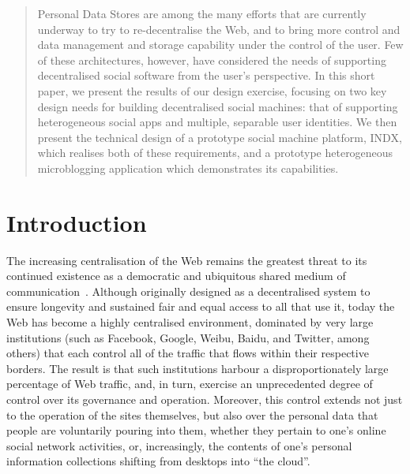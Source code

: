\documentclass{sig-alternate}
\begin{document}
\maketitle


\begin{abstract}
Personal Data Stores are among the many efforts that are currently underway to try to re-decentralise the Web, and to bring more control and data management and storage capability under the control of the user.  Few of these architectures, however, have considered the needs of supporting decentralised social software from  the user's perspective. In this short paper, we present the results of our design exercise, focusing on two key design needs for building decentralised social machines: that of supporting heterogeneous social apps and multiple, separable user identities. We then present the technical design of a prototype social machine platform, INDX, which realises both of these requirements, and a prototype heterogeneous microblogging application which demonstrates its capabilities.
\end{abstract}




\section{Introduction}

The increasing centralisation of the Web remains the greatest threat to its continued existence as a democratic and ubiquitous shared medium of communication~\cite{redecent}. Although originally designed as a decentralised system to ensure longevity and sustained fair and equal access to all that use it, today the Web has become a highly centralised environment, dominated by very large institutions (such as Facebook, Google, Weibu, Baidu, and Twitter, among others) that each control all of the traffic that flows within their respective borders.  The result is that such institutions harbour a disproportionately large percentage of Web traffic, and, in turn, exercise an unprecedented degree of control over its governance and operation.  Moreover, this control extends not just to the operation of the sites themselves, but also over the personal data that people are voluntarily pouring into them, whether they pertain to one's online social network activities, or, increasingly, the contents of one's personal information collections shifting from desktops into ``the cloud''.
\end{document}
